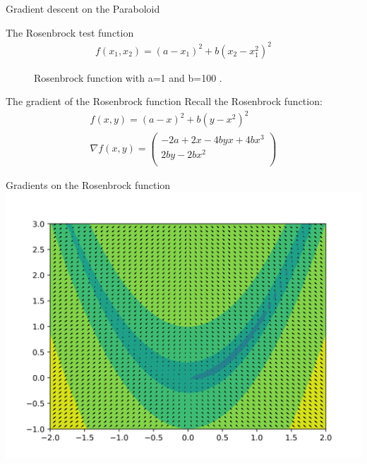 \documentclass{beamer}
\begin{document}
    \begin{frame}{Gradient descent on the Paraboloid}
      \centering
    \end{frame}

    \begin{frame}{The Rosenbrock test function}
      \begin{align}
        f(x_1, x_2) = (a - x_1)^2 + b(x_2 - x_1^2)^2
      \end{align}
      \begin{figure}
        
        \caption{Rosenbrock function with a=1 and b=100 .}
      \end{figure}
    \end{frame}

    \begin{frame}{The gradient of the Rosenbrock function}
      Recall the Rosenbrock function:
      \begin{align}
        f(x, y) = (a - x)^2 + b(y - x^2)^2 \\
        \nabla f(x, y) = \begin{pmatrix}
          -2a + 2x - 4byx + 4bx^3 \\
          2by - 2bx^2 \\
        \end{pmatrix}
      \end{align}
    \end{frame}

    \begin{frame}{Gradients on the Rosenbrock function}
      \includegraphics[width=.9\linewidth]{./figures/quiver.png}
    \end{frame}
\end{document}
